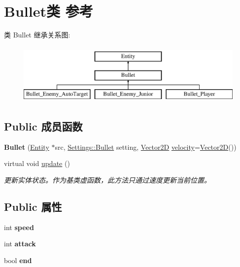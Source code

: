\hypertarget{class_bullet}{}\section{Bullet类 参考}
\label{class_bullet}
类 Bullet 继承关系图\+:\begin{figure}[H]
\begin{center}
\leavevmode
\includegraphics[height=3.000000cm]{class_bullet}
\end{center}
\end{figure}
\subsection*{Public 成员函数}
\begin{DoxyCompactItemize}
\item 
\mbox{\label{class_bullet_ae9b56731be2ca3ff77f3a3ee4eb0bd25}} 
{\bfseries Bullet} (\hyperlink{class_entity}{Entity} $\ast$src, \hyperlink{struct_settings_1_1_bullet}{Settings\+::\+Bullet} setting, \hyperlink{structbasic__vector2_d}{Vector2D} \hyperlink{class_entity_a386d25b56772b8913eb3e5adc636f6e0}{velocity}=\hyperlink{structbasic__vector2_d}{Vector2D}())
\item 
virtual void \hyperlink{class_bullet_a32f4a0611fe2dd245fee955d14ca1f68}{update} ()
\begin{DoxyCompactList}\small\item\em 更新实体状态。作为基类虚函数，此方法只通过速度更新当前位置。 \end{DoxyCompactList}\end{DoxyCompactItemize}
\subsection*{Public 属性}
\begin{DoxyCompactItemize}
\item 
\mbox{\label{class_bullet_a110bd4348fc7547125b4ec4bbf94d5f5}} 
int {\bfseries speed}
\item 
\mbox{\label{class_bullet_ab9e1e40341cddf25f8acc4e378b26f4a}} 
int {\bfseries attack}
\item 
\mbox{\label{class_bullet_aff37198e603e1a2b8ff28e0df6e156a4}} 
bool {\bfseries end}
\end{DoxyCompactItemize}
